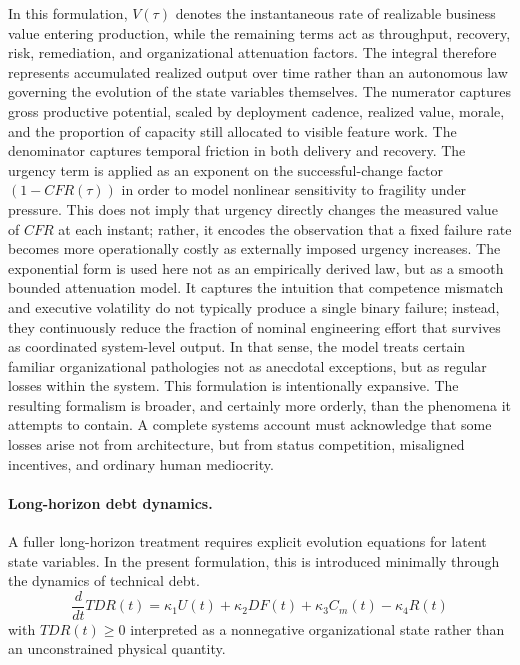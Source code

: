 \documentclass[letterpaper]{article}
\begin{document}
In this formulation, $V(\tau)$ denotes the instantaneous rate of realizable business value entering production, while the remaining terms act as throughput, recovery, risk, remediation, and organizational attenuation factors. The integral therefore represents accumulated realized output over time rather than an autonomous law governing the evolution of the state variables themselves.
The numerator captures gross productive potential, scaled by deployment cadence, realized value, morale, and the proportion of capacity still allocated to visible feature work.  The denominator captures temporal friction in both delivery and recovery.  
The urgency term is applied as an exponent on the successful-change factor $(1-CFR(\tau))$ in order to model nonlinear sensitivity to fragility under pressure. This does not imply that urgency directly changes the measured value of $CFR$ at each instant; rather, it encodes the observation that a fixed failure rate becomes more operationally costly as externally imposed urgency increases.
The exponential form is used here not as an empirically derived law, but as a smooth bounded attenuation model. It captures the intuition that competence mismatch and executive volatility do not typically produce a single binary failure; instead, they continuously reduce the fraction of nominal engineering effort that survives as coordinated system-level output.
In that sense, the model treats certain familiar organizational pathologies not as anecdotal exceptions, but as regular losses within the system.
This formulation is intentionally expansive. The resulting formalism is broader, and certainly more orderly, than the phenomena it attempts to contain.
A complete systems account must acknowledge that some losses arise not from architecture, but from status competition, misaligned incentives, and ordinary human mediocrity.
\paragraph{Long-horizon debt dynamics.}
A fuller long-horizon treatment requires explicit evolution equations for latent state variables. In the present formulation, this is introduced minimally through the dynamics of technical debt. 
\begin{equation}
\frac{d}{dt}TDR(t) = \kappa_1 U(t) + \kappa_2 DF(t) + \kappa_3 C_m(t) - \kappa_4 R(t)
\end{equation}
with $TDR(t) \geq 0$ interpreted as a nonnegative organizational state rather than an unconstrained physical quantity.
\end{document}
